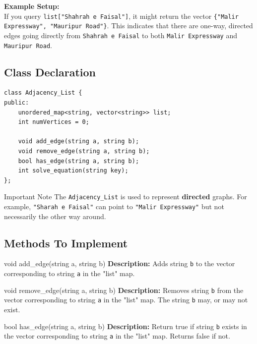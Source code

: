 \documentclass[11pt]{article}
\newcommand{\code}[1]{\texttt{#1}}
\begin{document}
\vspace{0.2cm}
\noindent
\textbf{Example Setup:}\\
If you query \texttt{list["Shahrah e Faisal"]}, it might return the vector \texttt{\{"Malir Expressway", "Mauripur Road"\}}. This indicates that there are one-way, directed edges going directly from \texttt{Shahrah e Faisal} to both \texttt{Malir Expressway} and \texttt{Mauripur Road}.


\subsection{Class Declaration}
\begin{lstlisting}
class Adjacency_List {
public:
    unordered_map<string, vector<string>> list;
    int numVertices = 0;
    
    void add_edge(string a, string b);
    void remove_edge(string a, string b);
    bool has_edge(string a, string b);
    int solve_equation(string key);
};
\end{lstlisting}

\begin{warningbox}{Important Note}
The \code{Adjacency\_List} is used to represent \textbf{directed} graphs. For example, \code{"Sharah e Faisal"} can point to \code{"Malir Expressway"} but not necessarily the other way around.
\end{warningbox}


\subsection{Methods To Implement}

\begin{methodbox}{void add\_edge(string a, string b)}
\textbf{Description:} Adds string \code{b} to the vector corresponding to string \code{a} in the "list" map.
\end{methodbox}

\begin{methodbox}{void remove\_edge(string a, string b)}
\textbf{Description:} Removes string \code{b} from the vector corresponding to string \code{a} in the "list" map. The string \code{b} may, or may not exist.
\end{methodbox}

\begin{methodbox}{bool has\_edge(string a, string b)}
\textbf{Description:} Return true if string \code{b} exists in the vector corresponding to string \code{a} in the "list" map. Returns false if not.
\end{methodbox}
\end{document}
